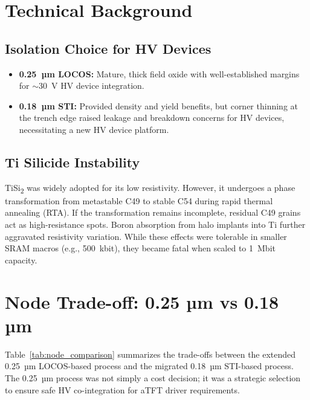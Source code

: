 \documentclass[conference]{IEEEtran}
\begin{document}
\section{Technical Background}
\subsection{Isolation Choice for HV Devices}
\begin{itemize}
    \item \textbf{0.25~µm LOCOS:} Mature, thick field oxide with well-established margins for $\sim$30~V HV device integration.
    \item \textbf{0.18~µm STI:} Provided density and yield benefits, but corner thinning at the trench edge raised leakage and breakdown concerns for HV devices, necessitating a new HV device platform.
\end{itemize}

\subsection{Ti Silicide Instability}
TiSi\textsubscript{2} was widely adopted for its low resistivity. However, it undergoes a phase transformation from metastable C49 to stable C54 during rapid thermal annealing (RTA).  
If the transformation remains incomplete, residual C49 grains act as high-resistance spots.  
Boron absorption from halo implants into Ti further aggravated resistivity variation.  
While these effects were tolerable in smaller SRAM macros (e.g., 500~kbit), they became fatal when scaled to 1~Mbit capacity.

\section{Node Trade-off: 0.25 µm vs 0.18 µm}
Table~\ref{tab:node_comparison} summarizes the trade-offs between the extended
0.25~µm LOCOS-based process and the migrated 0.18~µm STI-based process.
The 0.25~µm process was not simply a cost decision; it was a strategic selection to ensure safe HV co-integration for aTFT driver requirements.
\end{document}
